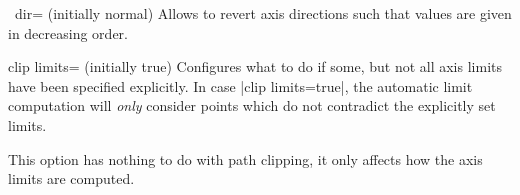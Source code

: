 \begin{pgfplotsxykey}{\x\ dir= (initially normal)}
\label{key:pgfplots:xydir}
	Allows to revert axis directions such that values are given in decreasing order.
\begin{codeexample}[]
\end{codeexample}

\begin{codeexample}[]
\end{codeexample}
\end{pgfplotsxykey}

\begin{pgfplotskey}{clip limits= (initially true)}
	Configures what to do if some, but not all axis limits have been specified explicitly. In case |clip limits=true|, the automatic limit computation will \emph{only} consider points which do not contradict the explicitly set limits. 

	This option has nothing to do with path clipping, it only affects how the axis limits are computed.
\end{pgfplotskey}

